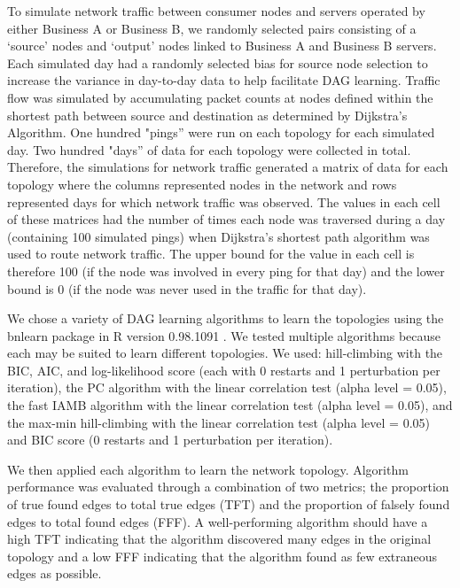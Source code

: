 \documentclass[conference]{IEEEtran}
\begin{document}
To simulate network traffic between consumer nodes and servers operated by either Business A or Business B, we randomly selected pairs consisting of a ‘source' nodes and ‘output' nodes linked to Business A and Business B servers. Each simulated day had a randomly selected bias for source node selection to increase the variance in day-to-day data to help facilitate DAG learning. Traffic flow was simulated by accumulating packet counts at nodes defined within the shortest path between source and destination as determined by Dijkstra's Algorithm. One hundred "pings” were run on each topology for each simulated day. Two hundred "days” of data for each topology were collected in total. Therefore, the simulations for network traffic generated a matrix of data for each topology where the columns represented nodes in the network and rows represented days for which network traffic was observed. The values in each cell of these matrices had the number of times each node was traversed during a day (containing 100 simulated pings) when Dijkstra's shortest path algorithm was used to route network traffic. The upper bound for the value in each cell is therefore 100 (if the node was involved in every ping for that day) and the lower bound is 0 (if the node was never used in the traffic for that day).

We chose a variety of DAG learning algorithms to learn the topologies using the bnlearn package \cite{b15} in R version 0.98.1091 \cite{b16}. We tested multiple algorithms because each may be suited to learn different topologies. We used: hill-climbing with the BIC, AIC, and log-likelihood score (each with 0 restarts and 1 perturbation per iteration), the PC algorithm with the linear correlation test (alpha level = 0.05), the fast IAMB algorithm with the linear correlation test (alpha level = 0.05), and the max-min hill-climbing with the linear correlation test (alpha level = 0.05) and BIC score (0 restarts and 1 perturbation per iteration).

We then applied each algorithm to learn the network topology. Algorithm performance was evaluated through a combination of two metrics; the proportion of true found edges to total true edges (TFT) and the proportion of falsely found edges to total found edges (FFF). A well-performing algorithm should have a high TFT indicating that the algorithm discovered many edges in the original topology and a low FFF indicating that the algorithm found as few extraneous edges as possible.
\end{document}
